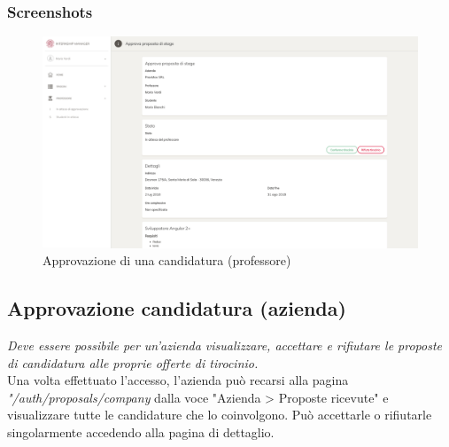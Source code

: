 \subsubsection{Screenshots}
\begin{figure}[H]
	\centering
	\includegraphics[width=1\textwidth]{Chapter3/Figs/screenshots/internshipproposalapprove}     
	\caption[Screenshot: approvazione di una candidatura (professore)]{Approvazione di una candidatura (professore)}
	\label{fig:screenshot:5}
\end{figure}

\pagebreak
\subsection{Approvazione candidatura (azienda)}\label{sec:approvazione-candidatura-azienda}

\textit{Deve essere possibile per un'azienda visualizzare, accettare e rifiutare le proposte di candidatura alle proprie offerte di tirocinio.} \\

\noindent
Una volta effettuato l'accesso, l'azienda può recarsi alla pagina \textit{"/auth/proposals/company} dalla voce "Azienda > Proposte ricevute" e visualizzare tutte le candidature che lo coinvolgono. Può accettarle o rifiutarle singolarmente accedendo alla pagina di dettaglio.

